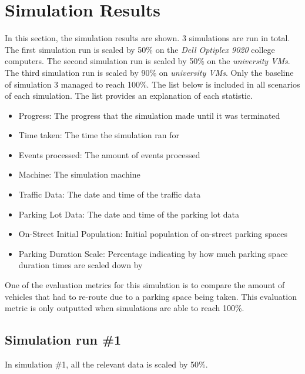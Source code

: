 \pagebreak

\section{Simulation Results}
In this section, the simulation results are shown. 3 simulations are run in total. The first simulation run is scaled by 50\% on the \textit{Dell Optiplex 9020} college computers. The second simulation run is scaled by 50\% on the \textit{university VMs}. The third simulation run is scaled by 90\% on \textit{university VMs}. Only the baseline of simulation 3 managed to reach 100\%. The list below is included in all scenarios of each simulation. The list provides an explanation of each statistic.

\begin{itemize}
    \setlength\itemsep{0em}
    \item Progress: The progress that the simulation made until it was terminated
    \item Time taken: The time the simulation ran for
    \item Events processed: The amount of events processed
    \item Machine: The simulation machine
    \item Traffic Data: The date and time of the traffic data
    \item Parking Lot Data: The date and time of the parking lot data
    \item On-Street Initial Population: Initial population of on-street parking spaces
    \item Parking Duration Scale: Percentage indicating by how much parking space duration times are scaled down by
\end{itemize}

One of the evaluation metrics for this simulation is to compare the amount of vehicles that had to re-route due to a parking space being taken. This evaluation metric is only outputted when simulations are able to reach 100\%.

\pagebreak

\subsection{Simulation run \#1}
In simulation \#1, all the relevant data is scaled by 50\%.
